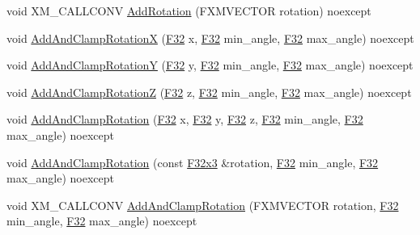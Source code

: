\begin{DoxyCompactItemize}
\item 
void X\+M\+\_\+\+C\+A\+L\+L\+C\+O\+NV \mbox{\hyperlink{classmage_1_1_local_transform_a44da0f859b1687cd5846928bfc6d602e}{Add\+Rotation}} (F\+X\+M\+V\+E\+C\+T\+OR rotation) noexcept
\item 
void \mbox{\hyperlink{classmage_1_1_local_transform_ad706493a65d14c9decbeec3e52c25316}{Add\+And\+Clamp\+RotationX}} (\mbox{\hyperlink{namespacemage_aa97e833b45f06d60a0a9c4fc22ae02c0}{F32}} x, \mbox{\hyperlink{namespacemage_aa97e833b45f06d60a0a9c4fc22ae02c0}{F32}} min\+\_\+angle, \mbox{\hyperlink{namespacemage_aa97e833b45f06d60a0a9c4fc22ae02c0}{F32}} max\+\_\+angle) noexcept
\item 
void \mbox{\hyperlink{classmage_1_1_local_transform_a960e6f431f8962f7aee701c0af1dc9e0}{Add\+And\+Clamp\+RotationY}} (\mbox{\hyperlink{namespacemage_aa97e833b45f06d60a0a9c4fc22ae02c0}{F32}} y, \mbox{\hyperlink{namespacemage_aa97e833b45f06d60a0a9c4fc22ae02c0}{F32}} min\+\_\+angle, \mbox{\hyperlink{namespacemage_aa97e833b45f06d60a0a9c4fc22ae02c0}{F32}} max\+\_\+angle) noexcept
\item 
void \mbox{\hyperlink{classmage_1_1_local_transform_a324c338aa8a85a74145e5641f9c65c96}{Add\+And\+Clamp\+RotationZ}} (\mbox{\hyperlink{namespacemage_aa97e833b45f06d60a0a9c4fc22ae02c0}{F32}} z, \mbox{\hyperlink{namespacemage_aa97e833b45f06d60a0a9c4fc22ae02c0}{F32}} min\+\_\+angle, \mbox{\hyperlink{namespacemage_aa97e833b45f06d60a0a9c4fc22ae02c0}{F32}} max\+\_\+angle) noexcept
\item 
void \mbox{\hyperlink{classmage_1_1_local_transform_aa5c60513e379baae81f79cea835d1896}{Add\+And\+Clamp\+Rotation}} (\mbox{\hyperlink{namespacemage_aa97e833b45f06d60a0a9c4fc22ae02c0}{F32}} x, \mbox{\hyperlink{namespacemage_aa97e833b45f06d60a0a9c4fc22ae02c0}{F32}} y, \mbox{\hyperlink{namespacemage_aa97e833b45f06d60a0a9c4fc22ae02c0}{F32}} z, \mbox{\hyperlink{namespacemage_aa97e833b45f06d60a0a9c4fc22ae02c0}{F32}} min\+\_\+angle, \mbox{\hyperlink{namespacemage_aa97e833b45f06d60a0a9c4fc22ae02c0}{F32}} max\+\_\+angle) noexcept
\item 
void \mbox{\hyperlink{classmage_1_1_local_transform_aa6b68f4b531aa34113b8df652c0245d8}{Add\+And\+Clamp\+Rotation}} (const \mbox{\hyperlink{namespacemage_a0fef5ab4e073c2d9ea876fefa3da4233}{F32x3}} \&rotation, \mbox{\hyperlink{namespacemage_aa97e833b45f06d60a0a9c4fc22ae02c0}{F32}} min\+\_\+angle, \mbox{\hyperlink{namespacemage_aa97e833b45f06d60a0a9c4fc22ae02c0}{F32}} max\+\_\+angle) noexcept
\item 
void X\+M\+\_\+\+C\+A\+L\+L\+C\+O\+NV \mbox{\hyperlink{classmage_1_1_local_transform_a00559d5316893be21c67d039a55d6d7f}{Add\+And\+Clamp\+Rotation}} (F\+X\+M\+V\+E\+C\+T\+OR rotation, \mbox{\hyperlink{namespacemage_aa97e833b45f06d60a0a9c4fc22ae02c0}{F32}} min\+\_\+angle, \mbox{\hyperlink{namespacemage_aa97e833b45f06d60a0a9c4fc22ae02c0}{F32}} max\+\_\+angle) noexcept

\end{DoxyCompactItemize}

